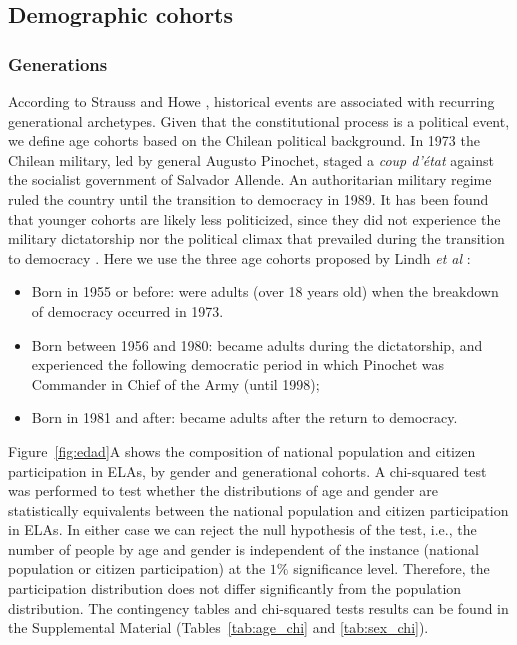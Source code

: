 \documentclass[onecolumn]{article}
\begin{document}
\subsection*{Demographic cohorts}
\subsubsection*{Generations}

According to Strauss and Howe \cite{StraussHowe}, historical events are associated with recurring generational archetypes. Given that the constitutional process is a political event, we define age cohorts based on the Chilean political background. In 1973 the Chilean military, led by general Augusto Pinochet, staged a \textit{coup d'état} against the socialist government of Salvador Allende. An authoritarian military regime ruled the country until the transition to democracy in 1989. It has been found that younger cohorts are likely less politicized, since they did not experience the military dictatorship nor the political climax that prevailed during the transition to democracy \cite{carlin}. Here we use the three age cohorts proposed by Lindh \textit{et al} :\cite{lindh}


\begin{itemize}
\item  Born in 1955 or before: were adults (over 18 years old) when the breakdown of democracy occurred in 1973. 
\item  Born between 1956 and 1980: became adults during the dictatorship, and experienced the following democratic period in which Pinochet was Commander in Chief of the Army (until 1998);
\item  Born in 1981 and after: became adults after the return to democracy.
\end{itemize}




Figure~\ref{fig:edad}A shows the composition of national population and citizen participation in ELAs, by gender and generational cohorts. A chi-squared test was performed to test whether the distributions of age and gender are statistically equivalents between the national population and citizen participation in ELAs. In either case we can reject the null hypothesis of the test, i.e.,  the number of people by age and gender is independent of the instance (national population or citizen participation) at the $1\%$ significance level. Therefore, the participation distribution does not differ significantly from the population distribution. The contingency tables and chi-squared tests results can be found in the Supplemental Material (Tables~\ref{tab:age_chi} and \ref{tab:sex_chi}). 
\end{document}
